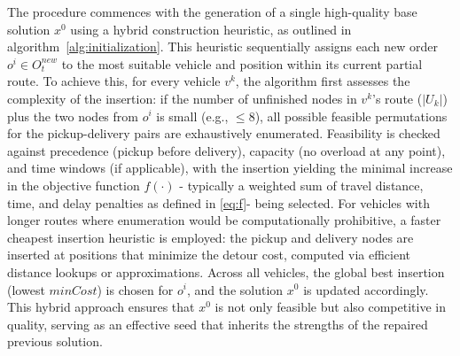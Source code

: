 \documentclass[]{interact}
\begin{document}
The procedure commences with the generation of a single high-quality base solution $x^0$ using a hybrid  construction heuristic, as outlined in algorithm~\ref{alg:initialization}. This heuristic sequentially assigns each new order $o^i \in O_t^{new}$ to the most suitable vehicle and position within its current partial route. To achieve this, for every vehicle $v^k$, the algorithm first assesses the complexity of the insertion: if the number of unfinished nodes in $v^k$'s route ($|U_k|$) plus the two nodes from $o^i$ is small (e.g., $\leq 8$), all possible feasible permutations for the pickup-delivery pairs are exhaustively enumerated. Feasibility is checked against precedence (pickup before delivery), capacity (no overload at any point), and time windows (if applicable), with the insertion yielding the minimal increase in the objective function $f(\cdot)$ - typically a weighted sum of travel distance, time, and delay penalties as defined in \autoref{eq:f}- being selected. For vehicles with longer routes where enumeration would be computationally prohibitive, a faster cheapest insertion heuristic is employed: the pickup and delivery nodes are inserted at positions that minimize the detour cost, computed via efficient distance lookups or approximations. Across all vehicles, the global best insertion (lowest $minCost$) is chosen for $o^i$, and the solution $x^0$ is updated accordingly. This hybrid approach ensures that $x^0$ is not only feasible but also competitive in quality, serving as an effective seed that inherits the strengths of the repaired previous solution.




\end{document}
